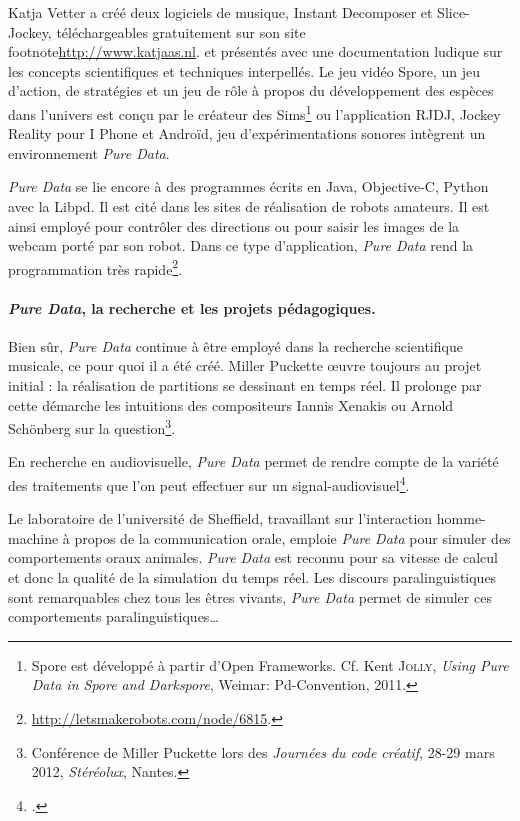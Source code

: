\documentclass{FramateX}
\begin{document}
\begin{refsection}
Katja Vetter a créé deux logiciels de musique, Instant
Decomposer et Slice-Jockey, téléchargeables gratuitement sur son site\\footnote{\url{http://www.katjaas.nl}.} et présentés
avec une documentation ludique sur les concepts scientifiques et
techniques interpellés. Le jeu vidéo Spore, un jeu d'action, de
stratégies et un jeu de rôle à propos du développement des espèces dans
l'univers est conçu par le créateur des Sims\footnote{Spore est
développé à partir d'Open Frameworks. Cf. Kent \textsc{Jolly}, \textit{Using Pure Data in
Spore and Darkspore}, Weimar: Pd-Convention, 2011.} ou l'application RJDJ,
Jockey Reality pour I Phone et Androïd, jeu d'expérimentations sonores
intègrent un environnement \textit{Pure Data}. 

\textit{Pure Data} se lie encore à des programmes écrits en Java, Objective-C,
Python avec la Libpd. Il est cité dans les sites de réalisation de
robots amateurs. Il est ainsi employé pour contrôler des directions ou
pour saisir les images de la webcam porté par son robot. Dans ce type
d'application, \textit{Pure Data} rend la programmation très
rapide\footnote{\url{http://letsmakerobots.com/node/6815}.}. 

\paragraph{\textit{Pure Data}, la recherche et les projets pédagogiques.}
Bien sûr, \textit{Pure Data} continue à être employé dans la recherche
scientifique musicale, ce pour quoi il a été créé. Miller Puckette
œuvre toujours au projet initial : la réalisation de partitions se
dessinant en temps réel. Il prolonge par cette démarche les intuitions
des compositeurs Iannis Xenakis ou Arnold Schönberg sur la
question\footnote{Conférence de Miller Puckette lors des \textit{Journées du
code créatif}, 28-29 mars 2012, \textit{Stéréolux}, Nantes.}. 

En recherche en audiovisuelle, \textit{Pure Data} permet de rendre compte de la
variété des traitements que l'on peut effectuer sur un
signal-audiovisuel\footnote{\cite{Millot2008}.}. 

Le laboratoire de l'université de Sheffield, travaillant sur
l'interaction homme-machine à propos de la communication orale, emploie
\textit{Pure Data} pour simuler des comportements oraux animales. \textit{Pure Data} est
reconnu pour sa vitesse de calcul et donc la qualité de la simulation
du temps réel. Les discours paralinguistiques sont remarquables chez
tous les êtres vivants, \textit{Pure Data} permet de simuler ces comportements
paralinguistiques…




\end{refsection}
\end{document}
